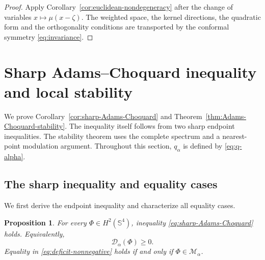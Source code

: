\documentclass[11pt]{article}
\newtheorem{proposition}[theorem]{Proposition}
\numberwithin{equation}{section}
\begin{document}
\begin{proof}
Apply Corollary~\ref{cor:euclidean-nondegeneracy} after the change of variables \(x\mapsto\mu(x-\zeta)\). The weighted space, the kernel directions, the quadratic form and the orthogonality conditions are transported by the conformal symmetry \eqref{eq:invariance}.
\end{proof}


\section{Sharp Adams--Choquard inequality and local stability}\label{sec:stability}

We prove Corollary~\ref{cor:sharp-Adams-Choquard} and Theorem~\ref{thm:Adams-Choquard-stability}. The inequality itself follows from two sharp endpoint inequalities. The stability theorem uses the complete spectrum and a nearest-point modulation argument. Throughout this section, \(q_{\alpha}\) is defined by \eqref{eq:q-alpha}.

\subsection{The sharp inequality and equality cases}

We first derive the endpoint inequality and characterize all equality cases.

\begin{proposition}\label{prop:sharp-Adams-Choquard}
For every \(\Phi\in H^{2}(\mathbb S^{4})\), inequality \eqref{eq:sharp-Adams-Choquard} holds. Equivalently,
\begin{equation}\label{eq:deficit-nonnegative}
\mathcal D_{\alpha}(\Phi)\geq0.
\end{equation}
Equality in \eqref{eq:deficit-nonnegative} holds if and only if \(\Phi\in\mathcal M_{\alpha}\).
\end{proposition}
\end{document}
